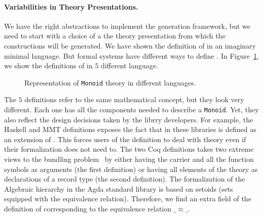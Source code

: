 \paragraph{Variabilities in Theory Presentations.}
We have the right abstractions to implement the generation framework, but we need to start with a choice of a the theory presentation from which the constructions will be generated. We have shown the definition of  in an imaginary minimal language. But formal systems have different ways to define . 
In Figure~\ref{fig:mon-diff-lang}, we show the definitions of  in $5$ different language. 
\begin{figure}
    
    \caption{Representation of \lstinline|Monoid| theory in different languages.}
    \label{fig:mon-diff-lang}
\end{figure}
The $5$ definitions refer to the same mathematical concept, but they look very different. 
Each one has all the components needed to describe a \verb|Monoid|. Yet, they also reflect the design decisions taken by the librry developers. 
For example, the Haskell and MMT definitions exposes the fact that \monoid in these libraries is defined as an extension of \semigroup. This forces users of the definition to deal with \semigroup theory even if their formalization does not need to. 
The two Coq definitions takes two extreme views to the bundling problem~\cite{lean2019,alhassy2019,spitters2011type} by either having the carrier and all the function symbols as arguments (the first definition) or having all elements of the theory as declarations of a record type (the second definition). 
The formalization of the Algebraic hierarchy in the Agda standard library is based on setoids (sets equipped with the equivalence relation). Therefore, we find an extra field of the definition of \monoid corresponding to the equivalence relation $\_\approx\_$. 

